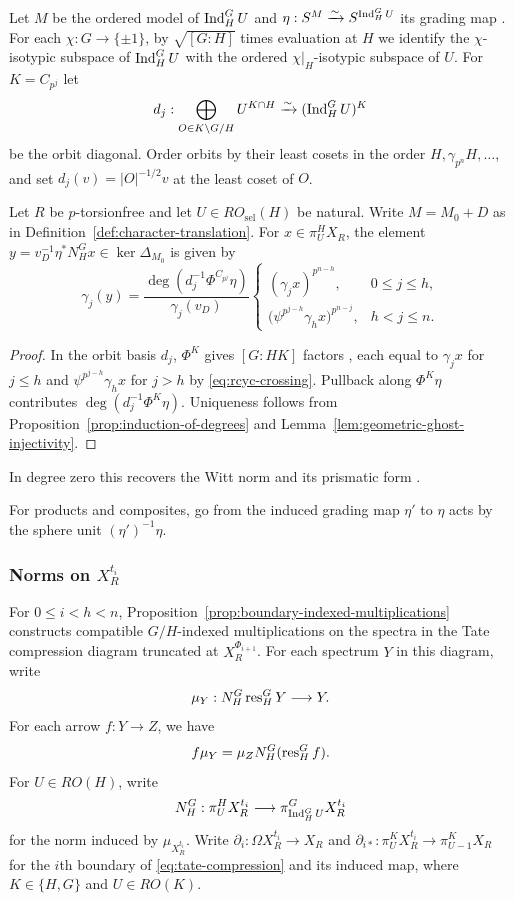 Let $M$ be the ordered model of $\operatorname{Ind}_H^G U$ and
$\eta:S^M\xrightarrow{\sim}S^{\operatorname{Ind}_H^G U}$ its grading map
\cite[Definition~5.1 and Remark~5.2]{GradedTambara}.
For each $\chi:G\to\{\pm1\}$, by $\sqrt{[G:H]}$ times evaluation at $H$
we identify the $\chi$-isotypic subspace of $\operatorname{Ind}_H^G U$ with the ordered
$\chi|_H$-isotypic subspace of $U$. For $K=C_{p^j}$ let
\[
d_j:\bigoplus_{O\in K\backslash G/H} U^{K\cap H}
  \xrightarrow{\sim}(\operatorname{Ind}_H^G U)^K
\]
be the orbit diagonal. Order orbits by their least cosets
in the order $H,\gamma_{p^n}H,\ldots$, and set
$d_j(v)=|O|^{-1/2}v$ at the least coset of $O$.

\begin{proposition}\label{prop:vertex-norms}
Let $R$ be $p$-torsionfree and let $U\in RO_{\mathrm{sel}}(H)$ be natural.
Write $M=M_0+D$ as in Definition~\ref{def:character-translation}.
For $x\in\pi_U^H X_R$, the element
$y=v_D^{-1}\eta^*N_H^Gx\in\ker\Delta_{M_0}$ is given by
\begin{equation*}
\gamma_j(y)=\frac{\deg(d_j^{-1}\Phi^{C_{p^j}}\eta)}{\gamma_j(v_D)}
\begin{cases}
(\gamma_jx)^{p^{n-h}},&0\le j\le h,\\
\bigl(\psi^{p^{j-h}}\gamma_hx\bigr)^{p^{n-j}},&h<j\le n.
\end{cases}
\end{equation*}
\end{proposition}

\begin{proof}
In the orbit basis $d_j$, $\Phi^K$ gives $[G:HK]$ factors
\cite[Appendix~A]{HHR}, each equal to $\gamma_jx$ for $j\le h$
and $\psi^{p^{j-h}}\gamma_hx$ for $j>h$
by \eqref{eq:rcyc-crossing}. Pullback along $\Phi^K\eta$ contributes
$\deg(d_j^{-1}\Phi^K\eta)$. Uniqueness follows from
Proposition~\ref{prop:induction-of-degrees} and
Lemma~\ref{lem:geometric-ghost-injectivity}.
\end{proof}

In degree zero this recovers the Witt norm
\cite[Theorems~1.4 and~4.1]{WittNorm} and its prismatic form
\cite[Section~3.1]{SulymaPrisms}.

For products and composites, go from the induced grading map
$\eta'$ to $\eta$ acts by the sphere unit $(\eta')^{-1}\eta$.

\subsubsection{Norms on $X_R^{t_i}$}
For $0\le i<h<n$, Proposition~\ref{prop:boundary-indexed-multiplications} constructs
compatible $G/H$-indexed multiplications on the spectra in the
Tate compression diagram truncated at $X_R^{\Phi_{i+1}}$.
For each spectrum $Y$ in this diagram, write
\[
\mu_Y:N_H^G\operatorname{res}_H^G Y\longrightarrow Y.
\]
For each arrow $f:Y\to Z$, we have
\[
f\mu_Y=\mu_ZN_H^G(\operatorname{res}_H^Gf).
\]
For $U\in RO(H)$, write
\[
N_H^G:\pi_U^H X_R^{t_i}
\longrightarrow\pi_{\operatorname{Ind}_H^G U}^G X_R^{t_i}
\]
for the norm induced by $\mu_{X_R^{t_i}}$.
Write $\partial_i:\Omega X_R^{t_i}\to X_R$ and
$\partial_{i*}:\pi_U^K X_R^{t_i}\to\pi_{U-1}^K X_R$ for the $i$th boundary
of \eqref{eq:tate-compression} and its induced map, where
$K\in\{H,G\}$ and $U\in RO(K)$.

